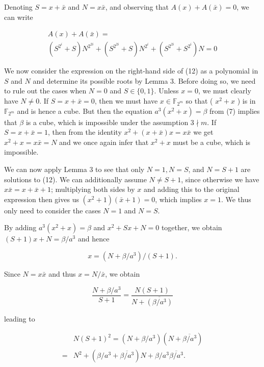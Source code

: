 \documentclass[10pt]{article}
\begin{document}
Denoting $S=x+\bar{x}$ and $N=x \bar{x}$, and observing that $A(x)+A(\bar{x})=0$, we can write

\[
\begin{array}{r}
A(x)+A(\bar{x})= \\
\left(S^{2^{i}}+S\right) N^{2^{2 i}}+\left(S^{2^{2 i}}+S\right) N^{2^{i}}+\left(S^{2^{2 i}}+S^{2^{i}}\right) N=0 \tag{12}
\end{array}
\]

We now consider the expression on the right-hand side of (12) as a polynomial in $S$ and $N$ and determine its possible roots by Lemma 3. Before doing so, we need to rule out the cases when $N=0$ and $S \in\{0,1\}$. Unless $x=0$, we must clearly have $N \neq 0$. If $S=x+\bar{x}=0$, then we must have $x \in \mathbb{F}_{2^{m}}$ so that ( $x^{2}+x$ ) is in $\mathbb{F}_{2^{m}}$ and is hence a cube. But then the equation $a^{3}\left(x^{2}+x\right)=\beta$ from (7) implies that $\beta$ is a cube, which is impossible under the assumption $3 \nmid m$. If $S=x+\bar{x}=1$, then from the identity $x^{2}+(x+\bar{x}) x=x \bar{x}$ we get $x^{2}+x=x \bar{x}=N$ and we once again infer that $x^{2}+x$ must be a cube, which is impossible.

We can now apply Lemma 3 to see that only $N=1, N=S$, and $N=S+1$ are solutions to (12). We can additionally assume $N \neq S+1$, since otherwise we have $x \bar{x}=x+\bar{x}+1$; multiplying both sides by $x$ and adding this to the original expression then gives us $\left(x^{2}+1\right)(\bar{x}+1)=0$, which implies $x=1$. We thus only need to consider the cases $N=1$ and $N=S$.

By adding $a^{3}\left(x^{2}+x\right)=\beta$ and $x^{2}+S x+N=0$ together, we obtain $(S+1) x+N=\beta / a^{3}$ and hence


\begin{equation*}
x=\left(N+\beta / a^{3}\right) /(S+1) . \tag{13}
\end{equation*}


Since $N=x \bar{x}$ and thus $x=N / \bar{x}$, we obtain

$$
\frac{N+\beta / a^{3}}{S+1}=\frac{N(S+1)}{N+\overline{\left(\beta / a^{3}\right)}}
$$

leading to


\begin{align*}
& N(S+1)^{2}=\left(N+\beta / a^{3}\right)\left(N+\overline{\beta / a^{3}}\right) \\
= & N^{2}+\left(\beta / a^{3}+\overline{\beta / a^{3}}\right) N+\beta / a^{3} \overline{\beta / a^{3}} . \tag{14}
\end{align*}
\end{document}
